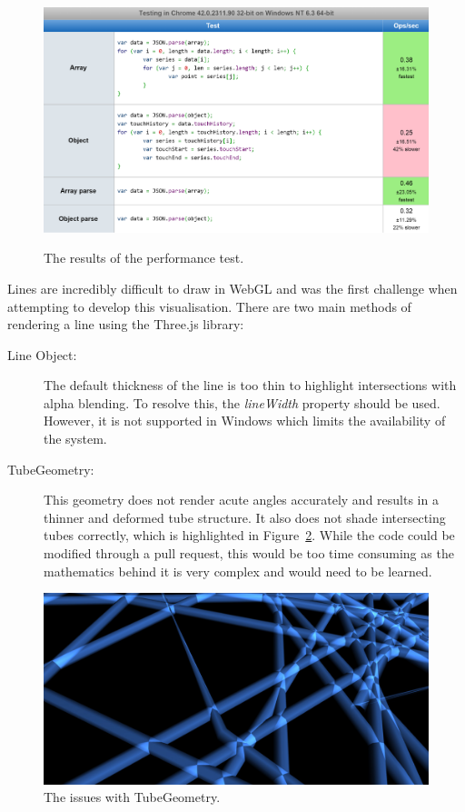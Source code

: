 \documentclass[a4paper]{article}
\begin{document}
\begin{appendices}
{			\begin{figure}[H]
        		\href{http://jsperf.com/object-and-array-reading}{\includegraphics[width=\textwidth]{images/performance-test}}
				\caption{The results of the performance test.}
				\label{fig:performance_test}
			\end{figure}
			
			Lines are incredibly difficult to draw in WebGL \citep{deslauriers2015lines} and was the first challenge when attempting to develop this visualisation. There are two main methods of rendering a line using the Three.js library: 
			
			\begin{description}
				\item[Line Object:] The default thickness of the line is too thin to highlight intersections with alpha blending. To resolve this, the \emph{lineWidth} property should be used. However, it is not supported in Windows which limits the availability of the system.
				\item[TubeGeometry:] This geometry does not render acute angles accurately and results in a thinner and deformed tube structure. It also does not shade intersecting tubes correctly, which is highlighted in Figure~\ref{fig:tube_geometry}. While the code could be modified through a pull request, this would be too time consuming as the mathematics behind it is very complex and would need to be learned.
			\end{description}
			
			\begin{figure}[H]
        		\includegraphics[width=\textwidth]{images/tube-geometry}
				\caption{The issues with TubeGeometry.}
				\label{fig:tube_geometry}
			\end{figure}
			
}
\end{appendices}
\end{document}

